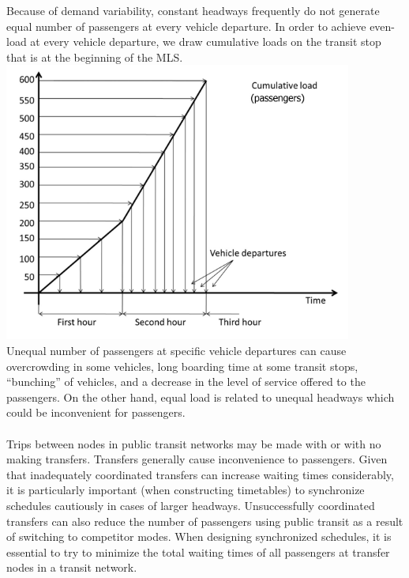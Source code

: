 Because of demand variability, constant headways frequently do not generate equal number of passengers at every vehicle departure. In order to achieve even-load at every vehicle departure, we draw cumulative loads on the transit stop that is at the beginning of the MLS.\\
\includegraphics{gfx/fig28.png}\\
Unequal number of passengers at specific vehicle departures can cause overcrowding in some vehicles, long boarding time at some transit stops, “bunching” of vehicles, and a decrease in the level of service offered to the passengers. On the other hand, equal load is related to unequal headways which could be inconvenient for passengers.\\\\
Trips between nodes in public transit networks may be made with or with no making transfers.
Transfers generally cause inconvenience to passengers. Given that inadequately coordinated transfers can increase waiting times considerably, it is particularly important (when constructing timetables) to synchronize schedules cautiously in cases of larger headways. Unsuccessfully coordinated transfers can also reduce the number of passengers using public transit as a result of switching to competitor modes. When designing synchronized schedules, it is essential to try to minimize the total waiting times of all passengers at transfer nodes in a transit network.
%

